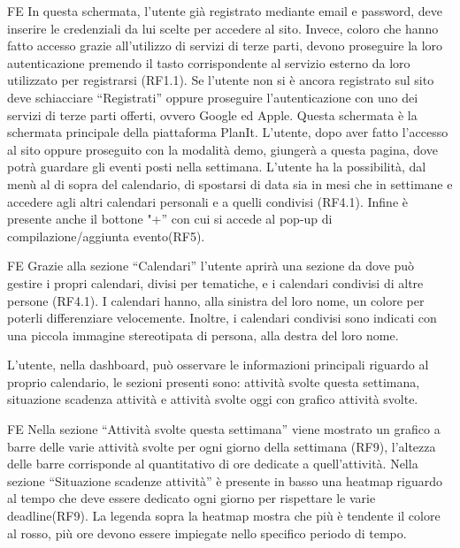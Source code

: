 \begin{listaPersonale}{FE}
     In questa schermata, l’utente già registrato mediante email e password, deve inserire le credenziali da lui scelte per accedere al sito. Invece, coloro che hanno fatto accesso grazie all’utilizzo di servizi di terze parti, devono proseguire la loro autenticazione premendo il tasto corrispondente al servizio esterno da loro utilizzato per registrarsi (RF1.1).
    Se l’utente non si è ancora registrato sul sito deve schiacciare “Registrati” oppure proseguire l’autenticazione con uno dei servizi di terze parti offerti, ovvero Google ed Apple.
     Questa schermata è la schermata principale della piattaforma PlanIt. L’utente, dopo aver fatto l’accesso al sito oppure proseguito con la modalità demo, giungerà a questa pagina, dove potrà guardare gli eventi posti nella settimana. L’utente ha la possibilità, dal menù al di sopra del calendario, di spostarsi di data sia in mesi che in settimane e accedere agli altri calendari personali e a quelli condivisi (RF4.1). Infine è presente anche il bottone "+” con cui si accede al pop-up di compilazione/aggiunta evento(RF5).
    \begin{listaPersonale2}{FE}
         Grazie alla sezione “Calendari” l’utente aprirà una sezione da dove può gestire i propri calendari, divisi per tematiche, e i calendari condivisi di altre persone (RF4.1). I calendari hanno, alla sinistra del loro nome, un colore per poterli differenziare velocemente. Inoltre, i calendari condivisi sono indicati con una piccola immagine stereotipata di persona, alla destra del loro nome.
    \end{listaPersonale2}
     L’utente, nella dashboard, può osservare le informazioni principali riguardo al proprio calendario, le sezioni presenti sono: attività svolte questa settimana, situazione scadenza attività e attività svolte oggi con grafico attività svolte.
    \begin{listaPersonale2}{FE}
         Nella sezione “Attività svolte questa settimana” viene mostrato un grafico a barre delle varie attività svolte per ogni giorno della settimana (RF9), l’altezza delle barre corrisponde al quantitativo di ore dedicate a quell’attività.
         Nella sezione “Situazione scadenze attività” è presente in basso una heatmap riguardo al tempo che deve essere dedicato ogni giorno per rispettare le varie deadline(RF9). La legenda sopra la heatmap mostra che più è tendente il colore al rosso, più ore devono essere impiegate nello specifico periodo di tempo.

\end{listaPersonale2}
\end{listaPersonale}

